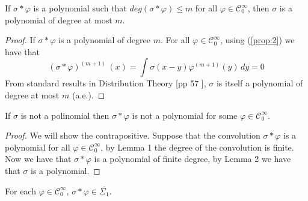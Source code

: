 \documentclass[../main.tex]{subfiles}
\begin{document}
	\begin{lema} %
		If $\sigma \ast \varphi$ is a polynomial such that $ deg (\sigma \ast \varphi) \leq m$ for all $\varphi \in \mathcal{C}^\infty_0$, then $\sigma$ is a polynomial of degree at most $m$. 
	\end{lema}
	\begin{proof} 
	If $\sigma \ast \varphi$ is a polynomial of degree $m$.
	For all $\varphi \in \mathcal{C}^\infty_0$, using (\ref{prop:2}) we have that
	$$(\sigma \ast \varphi)^{(m+1)} \, (x)=\int \sigma(x-y)\varphi^{(m+1)}(y) \, dy= 0$$  
	From standard results in Distribution Theory [pp 57 \cite{friedman1963generalized}], $\sigma $ is itself a polynomial of degree at most $m$ (a.e.).
	\end{proof} 

\begin{prop}
If $\sigma$ is not a polinomial then $\sigma \ast \varphi$ is not a polynomial for some $\varphi \in \mathcal{C}^\infty_0$. 
\end{prop}
\begin{proof}
We will show the contrapositive. Suppose that the convolution $\sigma \ast \varphi$ is a polynomial for all $\varphi \in \mathcal{C}^\infty_0$, by Lemma 1 the degree of the convolution is finite. Now we have that $\sigma \ast \varphi$ is a polynomial of finite degree, by Lemma 2 we have that $\sigma$ is a polynomial. 
\end{proof}

	\begin{lema} %
		For each $\varphi \in  \mathcal{C}^\infty_0$, $ \sigma \ast \varphi \in  \overline{\Sigma_1}$. 
		
	\end{lema}
	
\end{document}
